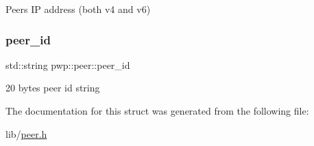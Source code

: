 Peer\textquotesingle{}s IP address (both v4 and v6) \mbox{\label{structpwp_1_1peer_a93c9dfe3e8766d364887f615d0880777}} 
\subsubsection{\texorpdfstring{peer\+\_\+id}{peer\_id}}
{\footnotesize\ttfamily std\+::string pwp\+::peer\+::peer\+\_\+id}

20 bytes peer id string 

The documentation for this struct was generated from the following file\+:\begin{DoxyCompactItemize}
\item 
lib/\hyperlink{peer_8h}{peer.\+h}\end{DoxyCompactItemize}
